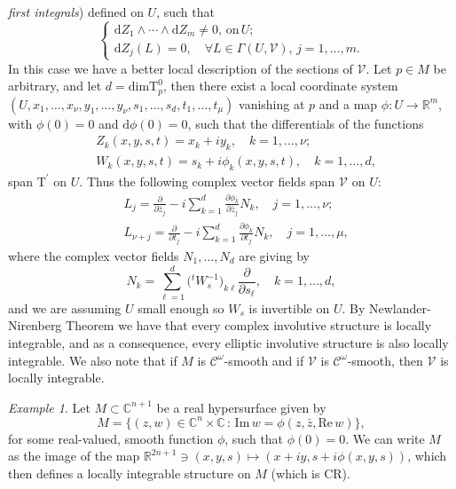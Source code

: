 \documentclass[11pt]{amsart}
\renewcommand{\Re}{\mathrm{Re}\,}
\renewcommand{\Im}{\mathrm{Im}\,}
\theoremstyle{definition}
\theoremstyle{remark}
\newtheorem{exa}[defn]{Example}
\theoremstyle{plain}
\begin{document}
\emph{first integrals}) defined on $U$, such that
%
\begin{equation*}
  \begin{cases}
    \mathrm{d}Z_1 \wedge \cdots \wedge \mathrm{d} Z_m \neq 0, \, \text{on}\, U;\\
    \mathrm{d}Z_j (L) = 0,\quad \forall L \in \Gamma(U, \mathcal{V}), \, j = 1, \dots, m.
  \end{cases}
\end{equation*}
%
In this case we have a better local description of the sections of
$\mathcal{V}$. Let $p \in M$ be arbitrary, and let
$d = \text{dim} \mathrm{T}^0_p$, then there exist a local coordinate
system $(U, x_1, \dots, x_\nu, y_1, \dots, y_\nu, s_1, \dots, s_d, t_1,
\dots, t_\mu)$ vanishing at $p$ and a map $\phi : U \longrightarrow \mathbb{R}^m$,
with $\phi(0) = 0$ and $\mathrm{d}\phi(0) = 0$, such that the
differentials of the functions
%
\begin{align*}
  &Z_k(x,y,s,t) = x_k + iy_k, \quad k = 1, \dots, \nu;\\
  &W_k(x,y,s,t) = s_k + i\phi_k (x,y,s,t), \quad k =1, \dots, d,
\end{align*}
%
span $\mathrm{T}^\prime$ on $U$. Thus the following complex vector
fields span $\mathcal{V}$ on $U$:
%
\begin{align*}
  &L_j = \frac{\partial}{\partial \bar{z}_j} - i \sum_{k=1}^d \frac{\partial \phi_k}{\partial \bar{z}_j} N_k, \quad  j = 1, \dots, \nu;\\
  &L_{\nu+ j} = \frac{\partial}{\partial t_j} - i\sum_{k=1}^d \frac{\partial \phi_k}{\partial t_j} N_k, \quad j=1, \dots, \mu,
\end{align*}
%
where the complex vector fields $N_1, \dots, N_d$ are giving by
%
\begin{equation*}
  N_k = \sum_{\ell = 1}^d \big({}^tW_s^{-1}\big)_{k\ell} \frac{\partial}{\partial s_\ell}, \quad k = 1, \dots, d,
\end{equation*}
%
and we are assuming $U$ small enough so $W_s$ is invertible on $U$. By
Newlander-Nirenberg Theorem we have that every complex involutive
structure is locally integrable, and as a consequence, every elliptic
involutive structure is also locally integrable. We also note that if
$M$ is $\mathcal{C}^\omega$-smooth and if $\mathcal{V}$ is
$\mathcal{C}^\omega$-smooth, then $\mathcal{V}$ is locally integrable.
%
\begin{exa}
  Let $M \subset \mathbb{C}^{n+1}$ be a real hypersurface given by
%
  \begin{equation*}
    M = \{(z,w) \in \mathbb{C}^n \times \mathbb{C} \,: \, \Im w = \phi(z,\bar z, \Re w) \},
  \end{equation*}
%
  for some real-valued, smooth function $\phi$, such that
  $\phi(0) = 0$. We can write $M$ as the image of the map
  $\mathbb{R}^{2n+1} \ni (x,y,s) \mapsto (x + iy, s + i\phi(x,y,s))$,
  which then defines a locally integrable structure on $M$ (which is
  CR).
%
\end{exa}
\end{document}
